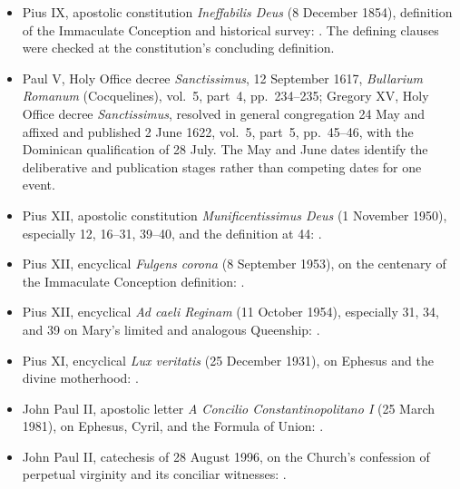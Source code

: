 \begin{itemize}
  \item Pius IX, apostolic constitution \emph{Ineffabilis Deus} (8 December 1854), definition of the Immaculate Conception and historical survey: . The defining clauses were checked at the constitution's concluding definition.
  \item Paul V, Holy Office decree \emph{Sanctissimus}, 12 September 1617, \emph{Bullarium Romanum} (Cocquelines), vol.~5, part~4, pp.~234--235; Gregory XV, Holy Office decree \emph{Sanctissimus}, resolved in general congregation 24 May and affixed and published 2 June 1622, vol.~5, part~5, pp.~45--46, with the Dominican qualification of 28 July. The May and June dates identify the deliberative and publication stages rather than competing dates for one event.
  \item Pius XII, apostolic constitution \emph{Munificentissimus Deus} (1 November 1950), especially 12, 16--31, 39--40, and the definition at 44: .
  \item Pius XII, encyclical \emph{Fulgens corona} (8 September 1953), on the centenary of the Immaculate Conception definition: .
  \item Pius XII, encyclical \emph{Ad caeli Reginam} (11 October 1954), especially 31, 34, and 39 on Mary's limited and analogous Queenship: .
  \item Pius XI, encyclical \emph{Lux veritatis} (25 December 1931), on Ephesus and the divine motherhood: .
  \item John Paul II, apostolic letter \emph{A Concilio Constantinopolitano I} (25 March 1981), on Ephesus, Cyril, and the Formula of Union: .
  \item John Paul II, catechesis of 28 August 1996, on the Church's confession of perpetual virginity and its conciliar witnesses: .

\end{itemize}
